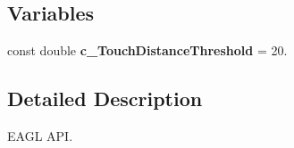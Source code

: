 \subsection*{Variables}
\begin{DoxyCompactItemize}
\item 
\hypertarget{group___a_p_i___e_a_g_l_ga89bcc8fe26f0ebb8d018250f13e7b7c4}{const double {\bfseries c\+\_\+\+Touch\+Distance\+Threshold} = 20.}\label{group___a_p_i___e_a_g_l_ga89bcc8fe26f0ebb8d018250f13e7b7c4}

\end{DoxyCompactItemize}


\subsection{Detailed Description}
E\+A\+G\+L A\+P\+I. 

